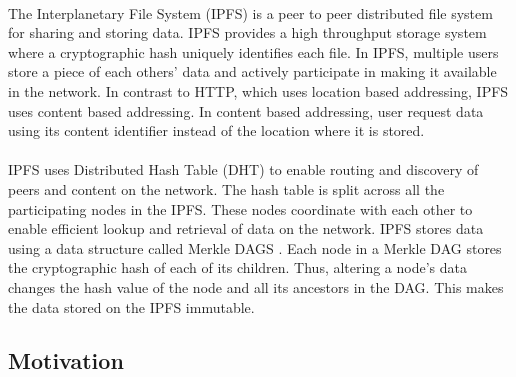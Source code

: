 \documentclass{article}
\begin{document}
        \paragraph{}
        The Interplanetary File System (IPFS) \cite{IPFS} is a peer to peer distributed file system for sharing and storing data. IPFS provides a high throughput storage system where a cryptographic hash uniquely identifies each file. In IPFS, multiple users store a piece of each others' data and actively participate in making it available in the network. In contrast to HTTP, which uses location based addressing, IPFS uses content based addressing. In content based addressing, user request data using its content identifier instead of the location where it is stored.

        \paragraph{}
        IPFS uses Distributed Hash Table (DHT) \cite{DHT} to enable routing and discovery of peers and content on the network. The hash table is split across all the participating nodes in the IPFS. These nodes coordinate with each other to enable efficient lookup and retrieval of data on the network. IPFS stores data using a data structure called Merkle DAGS \cite{IPFS}. Each node in a Merkle DAG stores the cryptographic hash of each of its children. Thus, altering a node's data changes the hash value of the node and all its ancestors in the DAG. This makes the data stored on the IPFS immutable.
        
    \subsection{Motivation}
\end{document}
